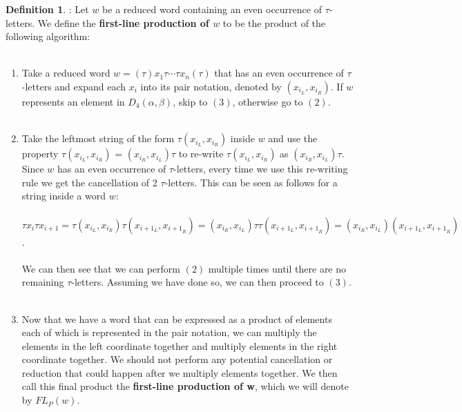 \documentclass[11pt]{amsart}
\theoremstyle{definition}
\newtheorem{definition}[theorem]{Definition}
\theoremstyle{remark}
\numberwithin{equation}{section}
\begin{document}
\begin{definition}:
Let $w$ be a reduced word containing an even occurrence of $\tau$-letters. We define the \textbf{first-line production of $w$} to be the product of the following algorithm: \\ \\
\begin{enumerate} 
\item Take a reduced word $w = (\tau) x_{1} \tau \cdots \tau x_{n} (\tau)$ that has an even occurrence of $\tau$-letters and expand each $x_{i}$ into its pair notation, denoted by $(x_{{i}_L},x_{{i}_R})$. If $w$ represents an element in $D_{4}(\alpha, \beta)$, skip to $(3)$, otherwise go to $(2)$. \\ \\
\item Take the leftmost string of the form $\tau (x_{{i}_L},x_{{i}_R})$ inside $w$ and use the property $\tau (x_{{i}_L},x_{{i}_R})$ = $ (x_{{i}_R},x_{{i}_L}) \tau$ to re-write $\tau (x_{{i}_L},x_{{i}_R})$ as $(x_{{i}_R},x_{{i}_L}) \tau$. Since $w$ has an even occurrence of $\tau$-letters, every time we use this re-writing rule we get the cancellation of 2 $\tau$-letters. This can be seen as follows for a string inside a word $w$: \\ \\
$ \tau x_{i} \tau x_{i+1} = \tau (x_{{i}_L},x_{{i}_R}) \tau (x_{{i+1_L}},x_{{i+1}_R}) = (x_{{i}_R},x_{{i}_L}) \tau \tau (x_{{i+1_L}},x_{{i+1}_R}) = (x_{{i}_R},x_{{i}_L})(x_{{i+1_L}},x_{{i+1}_R}) $.\\ \\
We can then see that we can perform $(2)$ multiple times until there are no remaining $\tau$-letters. Assuming we have done so, we can then proceed to $(3)$. \\ \\
\item Now that we have a word that can be expressed as a product of elements each of which is represented in the pair notation, we can multiply the elements in the left coordinate together and multiply elements in the right coordinate together. We should not perform any potential cancellation or reduction that could happen after we multiply elements together. We then call this final product the \textbf{first-line production of w}, which we will denote by $FL_{P}(w)$. \\ \\
\end{enumerate}
\end{definition}
\end{document}

